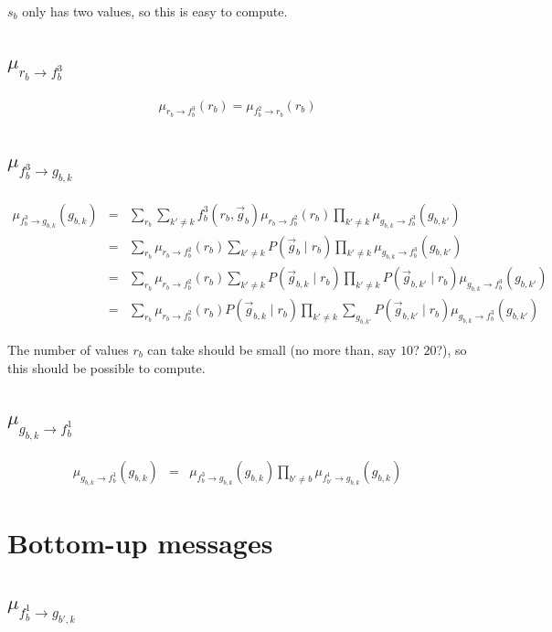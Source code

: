 \documentclass[11pt]{article}
\newcommand{\fb}[1]{f_b^{#1}}
\newcommand{\mFbRb}[1]{\mu_{ \fb{#1} \rightarrow r_{b}}}
\newcommand{\mRbFb}[1]{\mu_{ r_{b} \rightarrow  \fb{#1}}}
\newcommand{\mFbGbk}[1]{\mu_{ \fb{#1} \rightarrow g_{b,k}}}
\newcommand{\mGbkFb}[1]{\mu_{  g_{b,k} \rightarrow \fb{#1}}}
\begin{document}
$s_b$ only has two values, so this is easy to compute.

\subsection{$\mRbFb3$}

\begin{eqnarray}
\mRbFb3(r_b)  = \mFbRb2(r_b)
\end{eqnarray}

\subsection{$\mFbGbk3$}

\begin{eqnarray}
\mFbGbk3(g_{b,k}) &=& \sum_{r_b} \sum_{k' \neq k} \fb3(r_b,\vec{g}_b) \mRbFb2(r_b) \prod_{k' \neq k} \mGbkFb3(g_{b,k'}) \\
&=& \sum_{r_b} \mRbFb2(r_b) \sum_{k' \neq k}P(\vec{g}_b \mid r_b)  \prod_{k' \neq k}  \mGbkFb3(g_{b,k'}) \\
&=& \sum_{r_b} \mRbFb2(r_b) \sum_{k' \neq k} P(\vec{g}_{b,k} \mid r_b)  \prod_{k' \neq k} P(\vec{g}_{b,k'} \mid r_b)  \mGbkFb3(g_{b,k'}) \\
&=& \sum_{r_b} \mRbFb2(r_b)  P(\vec{g}_{b,k} \mid r_b) \prod_{k' \neq k} \sum_{g_{b,k'}}  P(\vec{g}_{b,k'} \mid r_b)  \mGbkFb3(g_{b,k'})
\end{eqnarray}

The number of values $r_b$ can take should be small (no more than, say $10$? $20$?), so this should be possible to compute.

\subsection{$\mGbkFb1$}

\begin{eqnarray}
\mGbkFb1(g_{b,k}) &=& \mFbGbk3(g_{b,k}) \prod_{b' \neq b} \mu_{f_{b'}^1 \rightarrow g_{b,k}}(g_{b,k})
\end{eqnarray}

\section{Bottom-up messages}


\subsection{$\mu_{\fb1 \rightarrow g_{b',k}}$}
\end{document}
